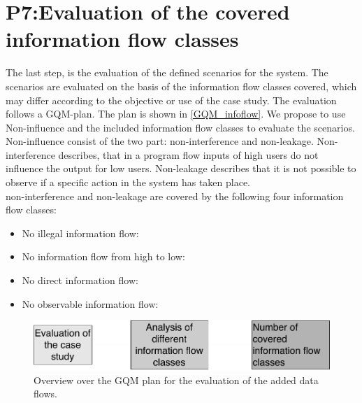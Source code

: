 \section{P7:Evaluation of the covered information flow classes}
The last step, is the evaluation of the defined scenarios for the system. The scenarios are evaluated on the basis of the information flow classes covered, which may differ according to the objective or use of the case study.  The evaluation follows a GQM-plan. The plan is shown in \autoref{GQM_infoflow}.
We propose to use Non-influence \cite{Noninfluence} and the included information flow classes to evaluate the scenarios. Non-influence consist of the two part: non-interference and non-leakage. Non-interference describes, that in a program flow inputs of high users do not influence the output for low users. Non-leakage describes that it is not possible to observe if a specific action in the system has taken place.\\
non-interference and non-leakage are covered by  the following four information flow classes:
\begin{itemize}
\item No illegal information flow:
\item No information flow from high to low:
\item No direct information flow:
\item No observable information flow:
\end{itemize}  %
\begin{figure}
\includegraphics[scale=0.6]{logos/GQM_infloFlow.pdf}
\caption{Overview over the GQM plan for the evaluation of the added data flows.}
\label{GQM_infoflow}
\end{figure}
